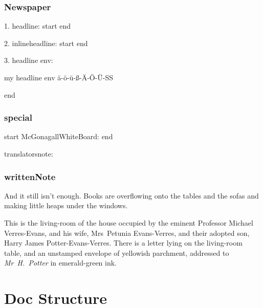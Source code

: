 \section{Newspaper}

1. headline: start  end

2. inlineheadline: start  end

3. headline env:
\begin{headlines}
my headline env ä-ö-ü-ß-Ä-Ö-Ü-SS
\end{headlines}
end

\section{special}
start McGonagallWhiteBoard:  end

translatorsnote:

\section{writtenNote}
\begin{writtenNote}
\end{writtenNote}

\begin{writtenNote}
And it still isn’t enough. Books are overflowing onto the tables and the sofas and making little heaps under the windows.

This is the living-room of the house occupied by the eminent Professor Michael Verres-Evans, and his wife, Mrs~Petunia Evans-Verres, and their adopted son, Harry James Potter-Evans-Verres. There is a letter lying on the living-room table, and an unstamped envelope of yellowish parchment, addressed to \emph{Mr~H.~Potter} in emerald-green ink.
\end{writtenNote}

\part{Doc Structure}

